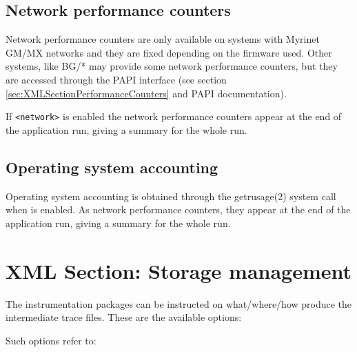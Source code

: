 \subsection{Network performance counters}\label{subsec:NetworkPerformanceCounters}

Network performance counters are only available on systems with Myrinet GM/MX networks and they are fixed depending on the firmware used. Other systems, like BG/* may provide some network performance counters, but they are accessed through the PAPI interface (see section \ref{sec:XMLSectionPerformanceCounters} and {PAPI} documentation).

If {\tt <network>} is enabled the network performance counters appear at the end of the application run, giving a summary for the whole run.

\subsection{Operating system accounting}\label{subsec:OperatingSystemAccounting}

Operating system accounting is obtained through the getrusage(2) system call when {\tt <resource-usage>} is enabled. As network performance counters, they appear at the end of the application run, giving a summary for the whole run.

\section{XML Section: Storage management}\label{sec:XMLSectionStorage}

The instrumentation packages can be instructed on what/where/how produce the intermediate trace files. These are the available options:



Such options refer to:

